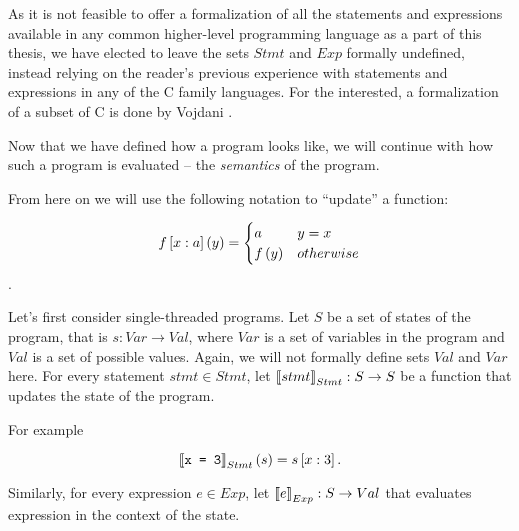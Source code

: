 \documentclass[..thesis.tex]{subfiles}
\begin{document}

As it is not feasible to offer a formalization of all the statements and expressions available in any common higher-level programming language
as a part of this thesis, we have elected to leave the sets $Stmt$ and $Exp$ formally undefined, instead relying on the reader's previous experience
with statements and expressions in any of the C family languages. For the interested, a formalization of a subset of C is done by Vojdani .



Now that we have defined how a program looks like, we will continue with how such a program is evaluated -- the \textit{semantics} of the program.

From here on we will use the following notation to ``update'' a function:

\begin{equation*}
f \left[ x : a \right] \left( y \right) = 
  \begin{cases}
  a & y = x \\
  f \left(  y \right) & otherwise \\ 
  \end{cases}
\end{equation*}.

Let's first consider single-threaded programs. Let $S$ be a set of states of the program, that is $s : Var \to Val$, where $Var$ is a set of
variables in the program and $Val$ is a set of possible values. Again, we will not formally define sets $Val$ and $Var$ here.
For every statement $stmt \in Stmt$, let $ \left\llbracket stmt \right\rrbracket_{Stmt} : S \to S$ be a function that updates the state of the program. 

For example

\begin{equation*}
 \left\llbracket \text{\texttt{x = 3}} \right\rrbracket_{Stmt} (s) = s \left[ x : 3 \right] \text{.}
\end{equation*}

Similarly, for every expression $e \in Exp$, let $\left\llbracket e \right\rrbracket_{Exp} : S \to Val$ that evaluates expression in the context of the state. 
\end{document}
